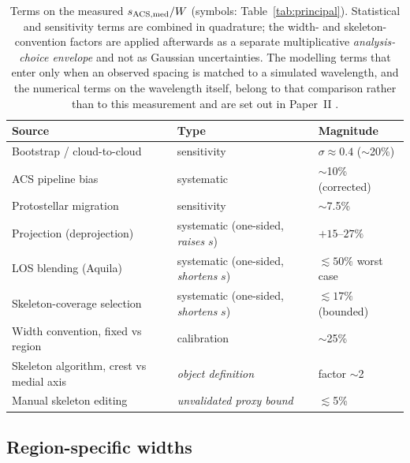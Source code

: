 \documentclass[usenatbib,twoside,twocolumn]{mnras}
\begin{document}
\begin{table}
\caption{Terms on the measured $s_{\rm ACS,med}/W$ (symbols: Table~\ref{tab:principal}). Statistical and sensitivity terms are combined in quadrature; the width- and skeleton-convention factors are applied afterwards as a separate multiplicative \emph{analysis-choice envelope} and not as Gaussian uncertainties. The modelling terms that enter only when an observed spacing is matched to a simulated wavelength, and the numerical terms on the wavelength itself, belong to that comparison rather than to this measurement and are set out in Paper~II \citep{PaperII}.}
\label{tab:errorbudget}
\footnotesize
\setlength{\tabcolsep}{3pt}
\begin{tabular}{@{}p{3.1cm}p{1.9cm}p{2.3cm}@{}}
\toprule
Source & Type & Magnitude \\
\midrule
Bootstrap / cloud-to-cloud & sensitivity & $\sigma\approx0.4$ ($\sim$20\%) \\
ACS pipeline bias & systematic & $\sim$10\% (corrected) \\
Protostellar migration & sensitivity & $\sim$7.5\% \\
Projection (deprojection) & systematic (one-sided, \emph{raises} $s$) & $+15$--$27\%$ \\
LOS blending (Aquila) & systematic (one-sided, \emph{shortens} $s$) & $\lesssim50\%$ worst case \\
Skeleton-coverage selection & systematic (one-sided, \emph{shortens} $s$) & $\lesssim17\%$ (bounded) \\
Width convention, fixed vs region & calibration & $\sim$25\% \\
Skeleton algorithm, crest vs medial axis & \emph{object definition} & factor $\sim$2 \\
Manual skeleton editing & \emph{unvalidated proxy bound} & $\lesssim$5\% \\
\bottomrule
\end{tabular}
\end{table}


\subsection*{Region-specific widths}
\end{document}
